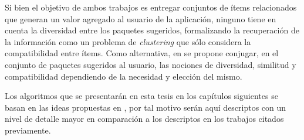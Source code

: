 Si bien el objetivo de ambos trabajos es entregar conjuntos de ítems relacionados que generan un valor agregado al usuario de la aplicación, ninguno tiene en cuenta la diversidad entre los paquetes sugeridos, formalizando la recuperación de la información como un problema de {\em clustering} que sólo considera la compatibilidad entre ítems. Como alternativa, en \cite{journals/tkde/Amer-YahiaBCFMZ14} se propone conjugar, en el conjunto de paquetes sugeridos al usuario, las nociones de diversidad, similitud y compatibilidad dependiendo de la necesidad y elección del mismo.

Los algoritmos que se presentarán en esta tesis en los capítulos siguientes se basan en las ideas propuestas en \cite{journals/tkde/Amer-YahiaBCFMZ14}, por tal motivo serán aquí descriptos con un nivel de detalle mayor en comparación a los descriptos en los trabajos citados previamente.

